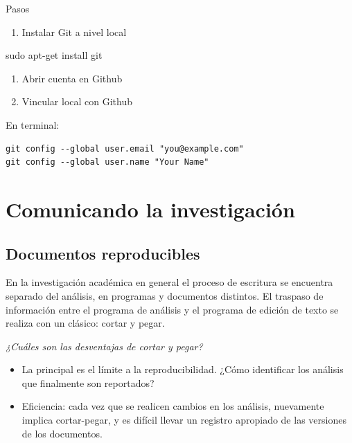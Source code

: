 \documentclass[11pt,]{book}
\providecommand{\tightlist}{%
  \setlength{\itemsep}{0pt}\setlength{\parskip}{0pt}}
\begin{document}
Pasos

\begin{enumerate}
\def\labelenumi{\arabic{enumi}.}
\tightlist
\item
  Instalar Git a nivel local
\end{enumerate}

sudo apt-get install git

\begin{enumerate}
\def\labelenumi{\arabic{enumi}.}
\setcounter{enumi}{1}
\item
  Abrir cuenta en Github
\item
  Vincular local con Github
\end{enumerate}

En terminal:

\begin{verbatim}
git config --global user.email "you@example.com"
git config --global user.name "Your Name"
\end{verbatim}

\hypertarget{comunicando-la-investigaciuxf3n}{%
\chapter{Comunicando la investigación}\label{comunicando-la-investigaciuxf3n}}

\hypertarget{documentos-reproducibles}{%
\section{Documentos reproducibles}\label{documentos-reproducibles}}

En la investigación académica en general el proceso de escritura se encuentra separado del análisis, en programas y documentos distintos. El traspaso de información entre el programa de análisis y el programa de edición de texto se realiza con un clásico: cortar y pegar.

\emph{¿Cuáles son las desventajas de cortar y pegar?}

\begin{itemize}
\item
  La principal es el límite a la reproducibilidad. ¿Cómo identificar los análisis que finalmente son reportados?
\item
  Eficiencia: cada vez que se realicen cambios en los análisis, nuevamente implica cortar-pegar, y es difícil llevar un registro apropiado de las versiones de los documentos.
\end{itemize}
\end{document}
